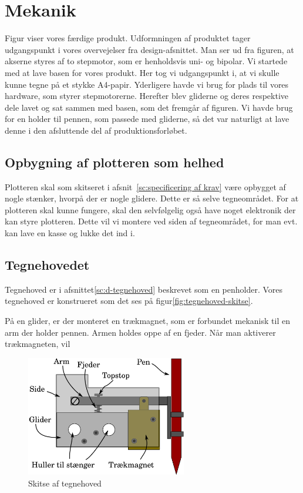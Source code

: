 \chapter[Implementering af mekanik]{Mekanik}


Figur  viser vores færdige
produkt.  Udformningen af produktet tager udgangspunkt i vores
overvejelser fra design-afsnittet.  Man ser ud fra figuren, at akserne
styres af to stepmotor, som er henholdsvis uni- og bipolar.  Vi
startede med at lave basen for vores produkt. Her tog vi udgangspunkt
i, at vi skulle kunne tegne på et stykke A4-papir. Yderligere havde vi
brug for plads til vores hardware, som styrer stepmotorerne. Herefter
blev gliderne og deres respektive dele lavet og sat sammen med basen,
som det fremgår af figuren. Vi havde brug for en holder til pennen,
som passede med gliderne, så det var naturligt at lave denne i den
afsluttende del af produktionsforløbet.

\section{Opbygning af plotteren som helhed}
Plotteren skal som skitseret i afsnit~\vref{sc:specificering af krav}
være opbygget af nogle stænker, hvorpå der er nogle glidere. Dette er
så selve tegneområdet. For at plotteren skal kunne fungere, skal den
selvfølgelig også have noget elektronik der kan styre plotteren. Dette
vil vi montere ved siden af tegneområdet, for man evt. kan lave en
kasse og lukke det ind i.


\section{Tegnehovedet}
Tegnehoved er i afsnittet\vref{sc:d-tegnehoved} beskrevet som en
penholder. Vores tegnehoved er konstrueret som det ses på
figur\vref{fig:tegnehoved-skitse}.

På en glider, er der monteret en trækmagnet, som er forbundet mekanisk
til en arm der holder pennen. Armen holdes oppe af en fjeder. Når man
aktiverer trækmagneten, vil

\begin{figure}[htbp]
  \centering
  \includegraphics[width=7cm]{./img/tegnehoved-skitse}
  \caption{Skitse af tegnehoved}
  \label{fig:tegnehoved-skitse}
\end{figure}

